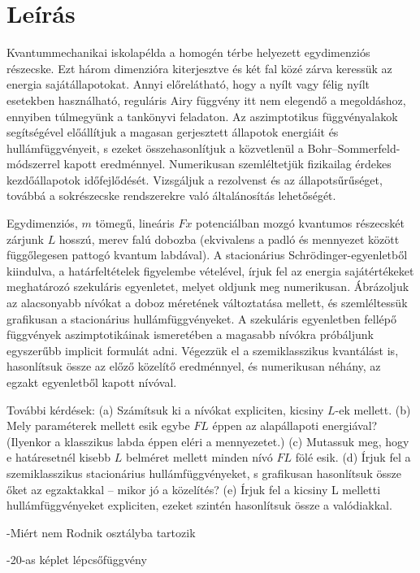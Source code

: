 \documentclass[a4paper,titlepage]{article}
\begin{document}
\section{Leírás}
	Kvantummechanikai iskolapélda a homogén térbe helyezett egydimenziós
	részecske. Ezt három dimenzióra kiterjesztve és két fal közé zárva
	keressük az energia sajátállapotokat. Annyi előrelátható, hogy a nyílt
	vagy félig nyílt esetekben használható, reguláris Airy függvény itt nem
	elegendő a megoldáshoz, ennyiben túlmegyünk a tankönyvi feladaton. Az
	aszimptotikus függvényalakok segítségével előállítjuk a magasan
	gerjesztett állapotok energiáit és hullámfüggvényeit, s ezeket
	összehasonlítjuk a közvetlenül a Bohr--Sommerfeld-módszerrel kapott
	eredménnyel. Numerikusan szemléltetjük fizikailag érdekes kezdőállapotok
	időfejlődését. Vizsgáljuk a rezolvenst és az állapotsűrűséget, továbbá a
	sokrészecske rendszerekre való általánosítás lehetőségét.
	
	Egydimenziós, $m$ tömegű, lineáris $F x$  potenciálban mozgó kvantumos részecskét zárjunk $L$ hosszú, merev falú dobozba (ekvivalens a padló és mennyezet között függőlegesen pattogó kvantum labdával).
	A stacionárius Schrödinger-egyenletből kiindulva, a határfeltételek figyelembe vételével, írjuk fel az energia sajátértékeket meghatározó szekuláris egyenletet, melyet oldjunk meg numerikusan. Ábrázoljuk az alacsonyabb nívókat a doboz méretének változtatása mellett, és szemléltessük grafikusan a stacionárius hullámfüggvényeket.  A szekuláris egyenletben fellépő függvények aszimptotikáinak ismeretében a magasabb nívókra próbáljunk egyszerűbb implicit formulát adni. Végezzük el a szemiklasszikus kvantálást is, hasonlítsuk össze az előző közelítő eredménnyel, és numerikusan néhány, az egzakt egyenletből kapott nívóval.

	További kérdések:  (a) Számítsuk ki a nívókat expliciten, kicsiny $L$-ek mellett. (b) Mely paraméterek mellett esik egybe $F L$ éppen az alapállapoti energiával?  (Ilyenkor a klasszikus labda éppen eléri a mennyezetet.)
	(c) Mutassuk meg, hogy e határesetnél kisebb $L$ belméret mellett minden nívó
	$F L$ fölé esik.
	(d) Írjuk fel a szemiklasszikus stacionárius hullámfüggvényeket, s grafikusan hasonlítsuk össze őket az egzaktakkal -- mikor jó a közelítés?
	(e) Írjuk fel a kicsiny L melletti hullámfüggvényeket expliciten, ezeket szintén hasonlítsuk össze a valódiakkal.
	
	-Miért nem Rodnik osztályba tartozik
	
	-20-as képlet lépcsőfüggvény
	
\end{document}
